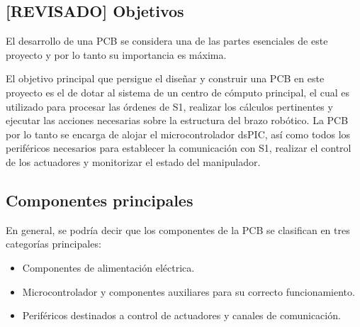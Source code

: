 \subsection{[REVISADO] Objetivos}

El desarrollo de una \ac{PCB} se considera una de las partes esenciales de este proyecto y por lo tanto su importancia es máxima.

El objetivo principal que persigue el diseñar y construir una \ac{PCB} en este proyecto es el de dotar al sistema de un centro de cómputo principal, el cual es utilizado para procesar las órdenes de S1, realizar los cálculos pertinentes y ejecutar las acciones necesarias sobre la estructura del brazo robótico. La \ac{PCB} por lo tanto se encarga de alojar el microcontrolador dsPIC, así como todos los periféricos necesarios para establecer la comunicación con S1, realizar el control de los actuadores y monitorizar el estado del manipulador.

\subsection{Componentes principales}
\label{ssec:main_components}

En general, se podría decir que los componentes de la \ac{PCB} se clasifican en tres categorías principales:
\begin{itemize}
    \item Componentes de alimentación eléctrica.
    \item Microcontrolador y componentes auxiliares para su correcto funcionamiento.
    \item Periféricos destinados a control de actuadores y canales de comunicación.
\end{itemize}

